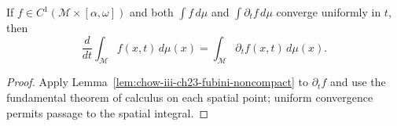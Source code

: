\begin{lemma}
\label{lem:chow-iii-ch23-differentiation-under-integral}
If $f\in C^1(\mathcal M\times[\alpha,\omega])$ and both
\(\int f\,d\mu\) and $\int\partial_tf\,d\mu$ converge uniformly in $t$, then
\[
\frac d{dt}\int_{\mathcal M}f(x,t)\,d\mu(x)
=\int_{\mathcal M}\partial_tf(x,t)\,d\mu(x).
\]
\end{lemma}
\begin{proof}
\sketch Apply Lemma~\ref{lem:chow-iii-ch23-fubini-noncompact} to $\partial_tf$ and use
the fundamental theorem of calculus on each spatial point; uniform convergence
permits passage to the spatial integral.
\end{proof}
